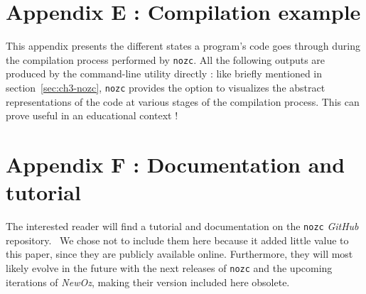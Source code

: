 \section{Appendix E : Compilation example}\label{sec:appendix-compilation}
This appendix presents the different states a program's code goes through during the compilation process performed by \texttt{nozc}.
All the following outputs are produced by the command-line utility directly : like briefly mentioned in section~\ref{sec:ch3-nozc}, \texttt{nozc} provides the option to visualizes the abstract representations of the code at various stages of the compilation process.
This can prove useful in an educational context !


\section{Appendix F : Documentation and tutorial}\label{sec:appendix-doc}
The interested reader will find a tutorial and documentation on the \texttt{nozc} \textit{GitHub} repository.~\cite{NozcGitHub}
We chose not to include them here because it added little value to this paper, since they are publicly available online.
Furthermore, they will most likely evolve in the future with the next releases of \texttt{nozc} and the upcoming iterations of \textit{NewOz}, making their version included here obsolete.